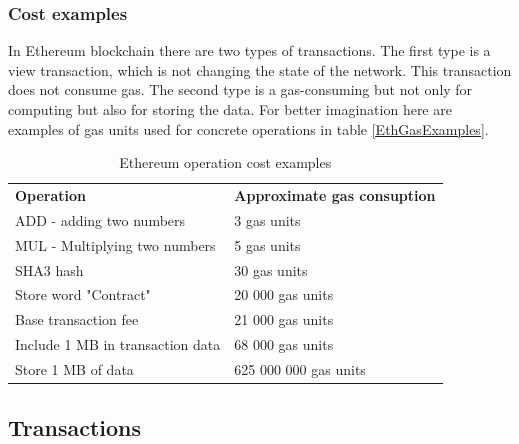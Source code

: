 \documentclass[thesis=M,english]{FITthesis}[2019/12/23]
\begin{document}
\subsubsection{Cost examples}
In Ethereum blockchain there are two types of transactions. The first type is  a view transaction, which is not changing the state of the network. This transaction does not consume gas. The second type is a gas-consuming but not only for computing but also for storing the data. For better imagination here are examples of gas units used for concrete operations in table \ref{EthGasExamples}. 
\begin{table}[ht!]
\caption{Ethereum operation cost examples}  \label{EthGasExamples}
\label{porovnanieDoodleFramadate}
\begin{tabular}{ll}
\textbf{Operation}                     & \textbf{Approximate gas consuption} \\
ADD - adding two numbers      & 3 gas units                \\
MUL - Multiplying two numbers & 5 gas units                \\
SHA3 hash                     & 30 gas units               \\
Store word "Contract"         & 20 000 gas units           \\
Base transaction fee          & 21 000 gas units           \\
Include 1 MB in transaction data & 68 000 gas units        \\
Store 1 MB of data            &	625 000 000 gas units        \\
\end{tabular}
\end{table}





\subsection{Transactions}
\end{document}
